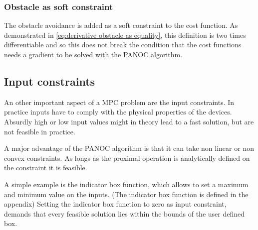 			\subsubsection{Obstacle as soft constraint}
				The obstacle avoidance is added as a soft constraint to the cost function. As demonstrated in \eqref{eq:derivative obstacle as equality}, this definition is two times differentiable and so this does not break the condition that the cost functions needs a gradient to be solved with the PANOC algorithm.
			
		\subsection{Input constraints}
			An other important aspect of a MPC problem are the input constraints. In practice inputs have to comply with the physical properties of the devices. Absurdly high or low input values might in theory lead to a fast solution, but are not feasible in practice.
			
			A major advantage of the PANOC algorithm is that it can take non linear or non convex constraints. As longs as the proximal operation is analytically defined on the constraint it is feasible. 
			
			A simple example is the indicator box function, which allows to set a maximum and minimum value on the inputs. (The indicator box function is defined in the appendix) Setting the indicator box function to zero as input constraint, demands that every feasible solution lies within the bounds of the user defined box.